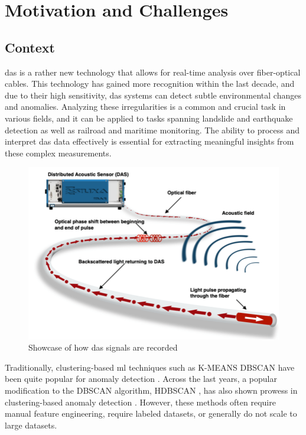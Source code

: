 \section{Motivation and Challenges}

\subsection{Context} 

\acrfull{das} is a rather new technology that allows for real-time analysis over fiber-optical cables. This technology has gained more recognition within the last decade, and due to their high sensitivity, \acrshort{das} systems can detect subtle environmental changes and anomalies. Analyzing these irregularities is a common and crucial task in various fields, and it can be applied to tasks spanning landslide and earthquake detection as well as railroad and maritime monitoring. The ability to process and interpret \acrshort{das} data effectively is essential for extracting meaningful insights from these complex measurements. \\

\begin{figure}[!h]
    \centering
    \includegraphics[width=0.7\linewidth]{figures/das.png}
    \caption{Showcase of how \acrshort{das} signals are recorded}
    \label{fig:das-fig}
\end{figure}

Traditionally, clustering-based \acrfull{ml} techniques such as K-MEANS \cite{hartigan1979k} DBSCAN \cite{ester1996density} have been quite popular for anomaly detection \cite{anomaly}. Across the last years, a popular modification to the DBSCAN algorithm, HDBSCAN \cite{rahman2016hdbscandensitybasedclustering}, has also shown prowess in clustering-based anomaly detection \cite{ariyaluran2022clustering}. However, these methods often require manual feature engineering, require labeled datasets, or generally do not scale to large datasets. 

